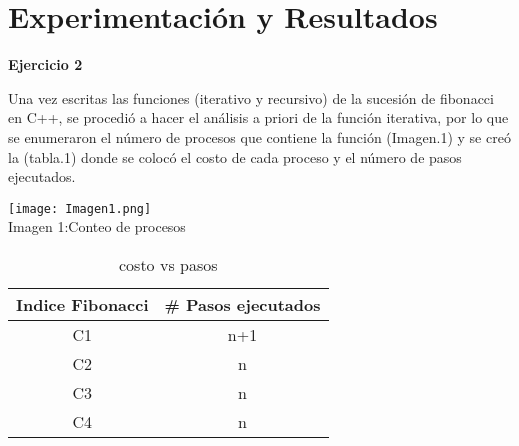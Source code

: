\documentclass[12pt,twoside]{article}
\begin{document}
\begin{itemize}
\end{itemize}
\newpage
\section{Experimentación y Resultados}
\textbf{Ejercicio 2\\}
 
Una vez escritas las funciones (iterativo y recursivo) de la sucesión de fibonacci  en C++, se  procedió a hacer el análisis a priori de la función iterativa, por lo que se enumeraron el número de procesos que contiene la función (Imagen.1) y se creó la (tabla.1) donde se colocó el costo de cada proceso y el número de pasos ejecutados. \\

\begin{center}
  \begin{minipage}{\linewidth}
    \centering
    \texttt{[image: Imagen1.png]}
    \\
    Imagen 1:Conteo de procesos
\end{minipage}
\end{center}
\medskip

\begin{table}[h]
    \centering
    \begin{minipage}{.45\linewidth}
      \centering
      \begin{tabular}{|c|c|}
        \hline
        \textbf{Indice Fibonacci} & \textbf{\# Pasos ejecutados} \\
        \hline

    C1  & n+1 \\
    C2  & n \\
    C3  & n \\
    C4  & n \\
   
        \hline
      \end{tabular}
      \caption{costo vs pasos}
      \label{tab:nombre_etiqueta}
    \end{minipage}
\end{table}
\vspace{15pt}
\end{document}
